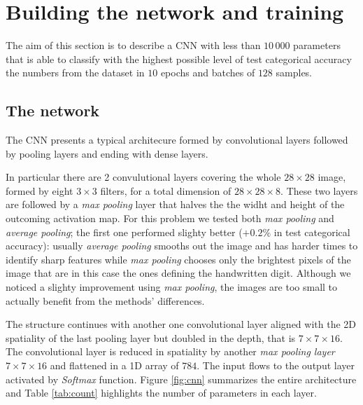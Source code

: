 \documentclass[compsoc]{IEEEtran}
\begin{document}
\section{Building the network and training}
The aim of this section is to describe a CNN with less than $10\,000$ parameters that is able to classify
with the highest possible level of test categorical accuracy the numbers from the dataset in $10$ epochs and batches of $128$ samples. 

\subsection{The network}
The CNN presents a typical architecure formed by convolutional layers followed by pooling layers and ending with dense layers. \par
In particular there are 2 convulutional layers covering the whole $28 \times 28$ image, formed by eight $3 \times 3$ filters, for a total dimension of $28 \times 28 \times 8$. These two layers are followed by a \emph{max pooling} layer that halves the the widht and height of the outcoming activation map. For this problem we tested both \emph{max pooling} and \emph{average pooling}; the first one performed slighty better ($+0.2\%$ in test categorical accuracy): usually \emph{average pooling} smooths out the image and has harder times to identify sharp features while \emph{max pooling} chooses only the brightest pixels of the image that are in this case the ones defining the handwritten digit. Although we noticed a slighty improvement using \emph{max pooling}, the images are too small to actually benefit from the methods' differences. \par
The structure continues with another one convolutional layer aligned with the 2D spatiality of the last pooling layer but doubled in the depth, that is $7 \times 7 \times 16$. The convolutional layer is reduced in spatiality by another \emph{max pooling layer} $7 \times 7 \times 16$ and flattened in a 1D array of $784$. The input flows to the output layer activated by \emph{Softmax} function. Figure \ref{fig:cnn} summarizes the entire architecture and Table \ref{tab:count} highlights the number of parameters in each layer.
\end{document}
